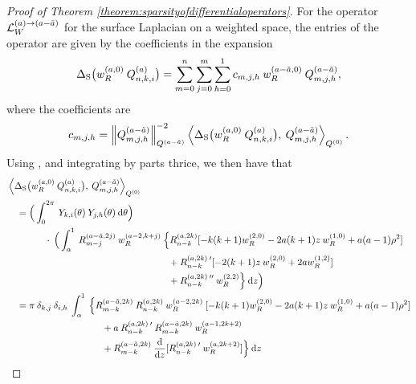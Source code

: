 \documentclass[11pt, oneside]{article}   	%
\begin{document}
\begin{proof}[Proof of Theorem \ref{theorem:sparsityofdifferentialoperators}]
For the operator $\mathcal{L}_W^{(a)\to(a-\tilde a)}$ for the surface Laplacian on a weighted space, the entries of the operator are given by the coefficients in the expansion 
\begin{align*}
	\Delta_{\rm S} \big(w_R^{(a,0)} \: Q_{n,k,i}^{(a)} \big) = \sum_{m=0}^{n} \sum_{j=0}^m \sum_{h=0}^1 c_{m,j,h} \: w_R^{(a-\tilde a,0)} \: Q_{m,j,h}^{(a - \tilde a)}, 
\end{align*}	
where the coefficients are
\begin{align*}
	c_{m,j,h} = \norm{\scopmjh^{(a - \tilde a)}}^{-2}_{\scop^{(a - \tilde a)}} \ip<\DeltaS \big(\genjacw^{(a,0)} \: \scopnki^{(a)} \big), \: \scopmjh^{(a - \tilde a)}>_{\scop^{(0)}}.
\end{align*}
Using , and integrating by parts thrice, we then have that
\begin{align*}
	&\ip<\DeltaS \big(\genjacw^{(a,0)} \: \scopnki^{(a)} \big), \: \scopmjh^{(a - \tilde a)}>_{\scop^{(0)}} \\
	&\quad = \Big( \int_0^{2\pi} \: \chki(\theta) \: \chjh(\theta) \: \D \theta \Big) \\
	&\quad \quad \quad \quad \cdot \: \Big( \int_\alpha^1 \: \genjacmmj^{(a - \tilde a, 2j)} \: \genjacw^{(a - 2, k+j)} \: \Big\{\genjacnmk^{(a,2k)} [-k(k+1) \genjacw^{(2,0)} - 2a(k+1)z \: \genjacw^{(1,0)} + a (a-1) \rho^2] \\
	&\quad \quad \quad \quad \quad \quad \quad \quad \quad \quad \quad \quad \quad \quad \quad \quad \quad + \genjacnmk^{(a,2k) \: \prime} [-2(k+1) z \: \genjacw^{(2,0)} + 2a \genjacw^{(1,2)}] \\
	&\quad \quad \quad \quad \quad \quad \quad \quad \quad \quad \quad \quad \quad \quad \quad \quad \quad + \genjacnmk^{(a,2k) \: \prime \prime} \: \genjacw^{(2,2)} \Big\} \: \D z \Big) \\
	&\quad = \pi \: \delta_{k,j} \: \delta_{i,h} \: \int_\alpha^1 \: \Big\{ \genjac_{m-k}^{(a - \tilde a, 2k)} \: \genjacnmk^{(a,2k)} \: \genjacw^{(a - 2, 2k)} \: [-k(k+1) \genjacw^{(2,0)} - 2a(k+1)z \: \genjacw^{(1,0)} + a (a-1) \rho^2] \\
	&\quad \quad \quad \quad \quad \quad \quad \quad \quad \quad + a \: \genjacnmk^{(a,2k) \: \prime} \: \genjac_{m-k}^{(a - \tilde a, 2k)} \: \genjacw^{(a - 1, 2k+2)} \\
	&\quad \quad \quad \quad \quad \quad \quad \quad \quad \quad + \genjac_{m-k}^{(a - \tilde a, 2k)} \: \ddx{z} [\genjacnmk^{(a,2k) \: \prime} \: \genjacw^{(a, 2k+2)}] \Big\} \: \D z \\

\end{align*}
\end{proof}
\end{document}
